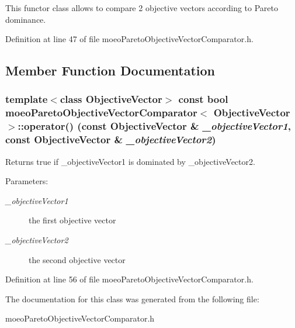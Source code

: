 This functor class allows to compare 2 objective vectors according to Pareto dominance. 



Definition at line 47 of file moeo\-Pareto\-Objective\-Vector\-Comparator.h.

\subsection{Member Function Documentation}
\subsubsection{\setlength{\rightskip}{0pt plus 5cm}template$<$class Objective\-Vector$>$ const bool \bf{moeo\-Pareto\-Objective\-Vector\-Comparator}$<$ \bf{Objective\-Vector} $>$::operator() (const \bf{Objective\-Vector} \& {\em \_\-objective\-Vector1}, const \bf{Objective\-Vector} \& {\em \_\-objective\-Vector2})\hspace{0.3cm}{\tt  [inline]}}\label{classmoeoParetoObjectiveVectorComparator_9bd4302396fb179efe14035dc097726c}


Returns true if \_\-objective\-Vector1 is dominated by \_\-objective\-Vector2. 

\begin{Desc}
\item[Parameters:]
\begin{description}
\item[{\em \_\-objective\-Vector1}]the first objective vector \item[{\em \_\-objective\-Vector2}]the second objective vector \end{description}
\end{Desc}


Definition at line 56 of file moeo\-Pareto\-Objective\-Vector\-Comparator.h.

The documentation for this class was generated from the following file:\begin{CompactItemize}
\item 
moeo\-Pareto\-Objective\-Vector\-Comparator.h\end{CompactItemize}
